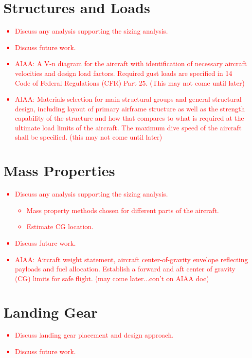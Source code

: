 \documentclass[conf]{new-aiaa}
\begin{document}
\section{Structures and Loads}
\textcolor{red}{
\begin{itemize}
    \item Discuss any analysis supporting the sizing analysis.
    \item Discuss future work.
    \item AIAA: A V-n diagram for the aircraft with identification of necessary aircraft velocities and design load factors.
    Required gust loads are specified in 14 Code of Federal Regulations (CFR) Part 25. (This may not come until later)
    \item AIAA: Materials selection for main structural groups and general structural design, including layout of primary airframe structure as well as the strength capability of the structure
    and how that compares to what is required at the ultimate load limits of the aircraft.
    The maximum dive speed of the aircraft shall be specified. (this may not come until later)
\end{itemize}}

\section{Mass Properties}
\textcolor{red}{
\begin{itemize}
    \item Discuss any analysis supporting the sizing analysis.
    \begin{itemize}
        \item Mass property methods chosen for different parts of the aircraft.
        \item Estimate CG location.
    \end{itemize}
    \item Discuss future work.
    \item AIAA: Aircraft weight statement, aircraft center-of-gravity envelope reflecting payloads and fuel allocation. Establish a forward and aft center of gravity (CG) limits for safe flight. (may come later...con't on AIAA doc)
\end{itemize}}

\section{Landing Gear}
\textcolor{red}{
\begin{itemize}
    \item Discuss landing gear placement and design approach.
    \item Discuss future work.
\end{itemize}}
\end{document}
